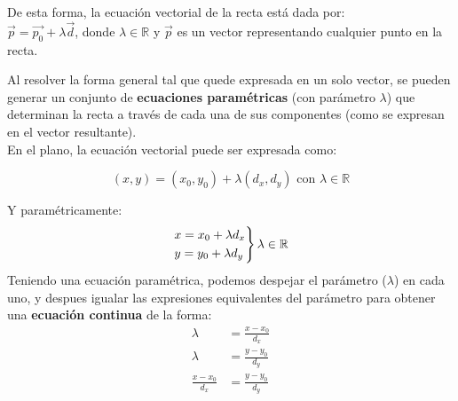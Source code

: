 De esta forma, la ecuación vectorial de la recta está dada por: \\
$\vec{p} = \vec{p_0} + \lambda\vec{d}$, donde $\lambda \in \mathbb{R}$ y $\vec{p}$ es un vector representando cualquier punto en la recta.



Al resolver la forma general tal que quede expresada en un solo vector, se pueden generar un conjunto de \textbf{ecuaciones paramétricas} (con parámetro $\lambda$) que determinan la recta a través de cada una de sus componentes (como se expresan en el vector resultante).\\

En el plano, la ecuación vectorial puede ser expresada como:

\begin{equation*}
(x, y) = (x_0, y_0) + \lambda(d_x,d_y) \text{ con } \lambda \in \mathbb{R}
\end{equation*}

Y paramétricamente:
\begin{equation*}
    \begin{rcases}
      x = x_0 + \lambda d_x \\
      y = y_0 + \lambda d_y
    \end{rcases}
    \lambda \in \mathbb{R}
    \end{equation*}
Teniendo una ecuación paramétrica, podemos despejar el parámetro ($\lambda$) en cada uno, y despues igualar las expresiones equivalentes del parámetro para obtener una \textbf{ecuación continua} de la forma:
\begin{equation*}
\begin{split}
    \lambda &= \frac{x - x_0}{d_x}\\
    \lambda &= \frac{y - y_0}{d_y}\\
    \frac{x-x_0}{d_x} &= \frac{y-y_0}{d_y}
\end{split}
\end{equation*}